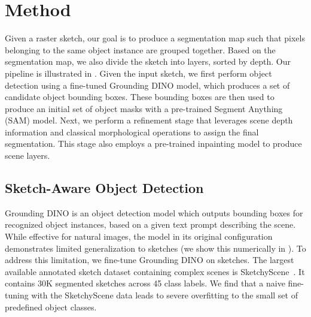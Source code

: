 \section{Method}
Given a raster sketch, our goal is to produce a segmentation map such that pixels belonging to the same object instance are grouped together. Based on the segmentation map, we also divide the sketch into layers, sorted by depth. Our pipeline is illustrated in . Given the input sketch, we first perform object detection using a fine-tuned Grounding DINO model, which produces a set of candidate object bounding boxes. These bounding boxes are then used to produce an initial set of object masks with a pre-trained Segment Anything (SAM) \cite{kirillov2023segany} model. Next, we perform a refinement stage that leverages scene depth information and classical morphological operations to assign the final segmentation. This stage also employs a pre-trained inpainting model \cite{von-platen-etal-2022-diffusers} to produce scene layers. 


\subsection{Sketch-Aware Object Detection}
Grounding DINO \cite{liu2023grounding} is an object detection model which outputs bounding boxes for recognized object instances, based on a given text prompt describing the scene. While effective for natural images, the model in its original configuration demonstrates limited generalization to sketches (we show this numerically in ). 
To address this limitation, we fine-tune Grounding DINO on sketches.  
The largest available annotated sketch dataset containing complex scenes is SketchyScene~\cite{Zou18SketchyScene}. It contains 30K segmented sketches across 45 class labels.
We find that a naive fine-tuning with the SketchyScene data leads to severe overfitting to the small set of predefined object classes.

